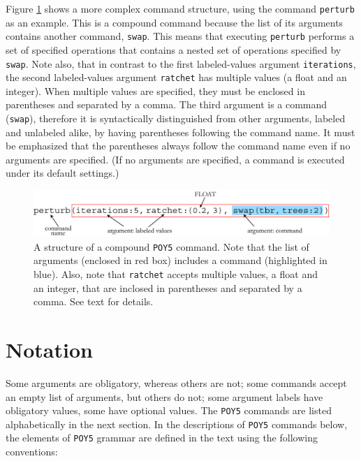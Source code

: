 \documentclass[11pt]{book}
\newcommand{\commandstyle}[1]{\texttt{#1}}
\newcommand{\poycommand}[1]{\commandstyle{#1}}
\newcommand{\poyargument}[1]{\commandstyle{#1}}
\newcommand{\poy}{\commandstyle{POY5}\xspace}
\begin{document}
Figure \ref{compositecommand} shows a more complex command structure, using the command \poycommand{perturb} as an example. This is a compound command because the list of its arguments contains another command, \poycommand{swap}. This means that executing \poycommand{perturb} performs a set of specified operations that contains a nested set of operations specified by \poycommand{swap}. Note also, that in contrast to the first labeled-values argument \poyargument{iterations}, the second labeled-values argument \poyargument{ratchet} has multiple values (a float and an integer). When multiple values are specified, they must be enclosed in parentheses and separated by a comma. The third argument is a command (\poycommand{swap}), therefore it is syntactically distinguished from other arguments, labeled and unlabeled alike, by having parentheses following the command name. It must be emphasized that the parentheses always follow the command name even if no arguments are specified. (If no arguments are specified, a command is executed under its default settings.)

\begin{figure}[htbp]
   \centering
   \includegraphics[width=1.0\textwidth]{doc/figures/fig-poycommand2.jpg}
   \caption{A structure of a compound \poy command. Note that the list of arguments
   (enclosed in red box) includes a command (highlighted in blue). Also, note that
   \poyargument{ratchet} accepts multiple values, a float and an integer, that are inclosed in
   parentheses and separated by a comma. See text for details.}
   \label{compositecommand}
\end{figure}

\section{Notation}

Some arguments are obligatory, whereas others are not; some commands accept an
empty list of arguments, but others do not; some argument labels have
obligatory values, some have optional values. The \poy commands are listed alphabetically in the next section. In the descriptions of
\poy commands below, the elements of \poy grammar are defined in
the text using the following conventions:
\end{document}
